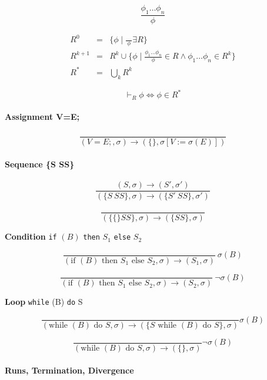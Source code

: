 \documentclass[12pt, a4paper]{book}
\begin{document}
$$
\frac{\phi_{1} \ldots \phi_{n}}
{\phi}
$$

\begin{eqnarray}
R^{0}   & = & \{\phi \mid \frac{}{\ \phi \ } \exists R\} \\
R^{k+1} & = & R^{k} \cup \{ \phi \mid \frac{\phi_{1} \ldots \phi_{n}}{\phi}
\in R \land \phi_{1}\ldots\phi_{n} \in R^{k} \} \\
R^{*}   & = & \bigcup_{k} R^{k}
\end{eqnarray}

$$
\vdash_{R} \phi \iff \phi \in R^{*}
$$

\paragraph{Assignment V=E;}

$$
\frac{}
{(V=E;,\sigma) \longrightarrow (\{ \}, \sigma [V := \sigma (E)] )}
$$

\paragraph{Sequence \{S SS\}}

$$
\frac{(S,\sigma) \longrightarrow (S',\sigma')}
{(\{ S\ SS \} , \sigma ) \longrightarrow (\{S'\ SS\}, \sigma')}
$$

$$
\frac{}
{(\{ \{ \} SS\}, \sigma) \longrightarrow (\{ SS \}, \sigma)}
$$

\noindent \textbf{Condition} \verb#if# $(B)$ \verb#then# $S_{1}$ \verb#else# $S_{2}$

$$
\frac{}
{(\textrm{if } (B) \textrm{ then } S_{1} \textrm{ else } S_{2}, \sigma) \longrightarrow (S_{1}, \sigma)}
\ \sigma(B)
$$

$$
\frac{}
{(\textrm{if } (B) \textrm{ then } S_{1} \textrm{ else } S_{2}, \sigma) \longrightarrow (S_{2}, \sigma)}
\ \lnot\sigma(B)
$$

\noindent \textbf{Loop} \verb#while# (B) \verb#do# S

$$
\frac{}
{(\textrm{while } (B) \textrm{ do } S, \sigma) \longrightarrow (\{ S \textrm{ while } (B) \textrm{ do } S\}, \sigma)}
\sigma(B)
$$

$$
\frac{}
{(\textrm{while } (B) \textrm{ do } S, \sigma) \longrightarrow (\{ \}, \sigma)}
\lnot\sigma(B)
$$

\paragraph{Runs, Termination, Divergence}
\end{document}
